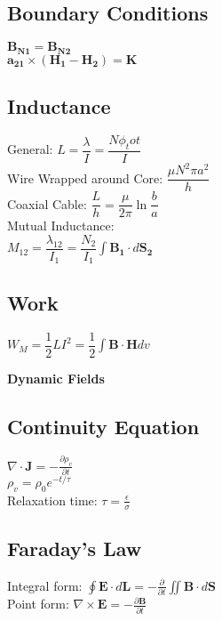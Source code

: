 \documentclass[12pt]{exam}
\begin{document}
\begin{multicols}{2}
\begin{flushleft}
	\subsection*{Boundary Conditions}\vspace{0.1in}
	{ \addtolength{\leftskip}{0.5in}
		$ \mathbf{B_{N1}} = \mathbf{B_{N2}} $ \\[4 pt]
		$ \mathbf{a_{21}}\times(\mathbf{H_1-H_2}) = \mathbf{K} $ \\[4 pt]
	}

	\subsection*{Inductance} \vspace{0.1in}
	{ \addtolength{\leftskip}{0.5in}
		General: \quad$ L = \dfrac{\lambda}{I} = \dfrac{N\phi_tot}{I}$  \\[4 pt]
		Wire Wrapped around Core: \quad$\dfrac{\mu N^2\pi a^2}{h} $ \\[4 pt]
		Coaxial Cable: \quad$\dfrac{L}{h} = \dfrac{\mu}{2\pi}\ln\dfrac{b}{a} $ \\ [4 pt]
		Mutual Inductance: \\ [4 pt]
		\quad$M_{12} = \dfrac{\lambda_{12}}{I_1} = \dfrac{N_2}{I_1}\int\mathbf{B_1}\cdot d\mathbf{S_2} $ \\ [4 pt]
	}

	\subsection*{Work}\vspace{0.1in}
	{ \addtolength{\leftskip}{0.5in}
		$W_M = \dfrac{1}{2}LI^2 = \dfrac{1}{2}\int\mathbf{B}\cdot\mathbf{H}dv$ \\ 
	}
	

\newpage
\huge
\textbf{Dynamic Fields}
\normalsize
\vspace{0.2in}
\subsection*{Continuity Equation}
{ \addtolength{\leftskip}{0.5in}
	$\nabla \cdot \mathbf{J} = -\frac{\partial \rho_v}{\partial t}$ \\[6pt]
	$\rho_v = \rho_0 e^{-t/\tau}$ \\[6pt]
	Relaxation time: 	$\tau = \frac{\epsilon}{\sigma}$ \\[6pt]
}

\normalsize
\vspace{0.2in}
\subsection*{Faraday's Law}
{ \addtolength{\leftskip}{0.5in}
	Integral form:	$\oint \mathbf{E} \cdot d\mathbf{L} = -\frac{\partial}{\partial t}\iint \mathbf{B}\cdot d\mathbf{S}$ \\[6pt]
	Point form: $\nabla \times \mathbf{E} =-\frac{\partial \mathbf{B}}{\partial t}$ \\[6pt]
	}


	
	
\end{flushleft}
\end{multicols}
\end{document}
